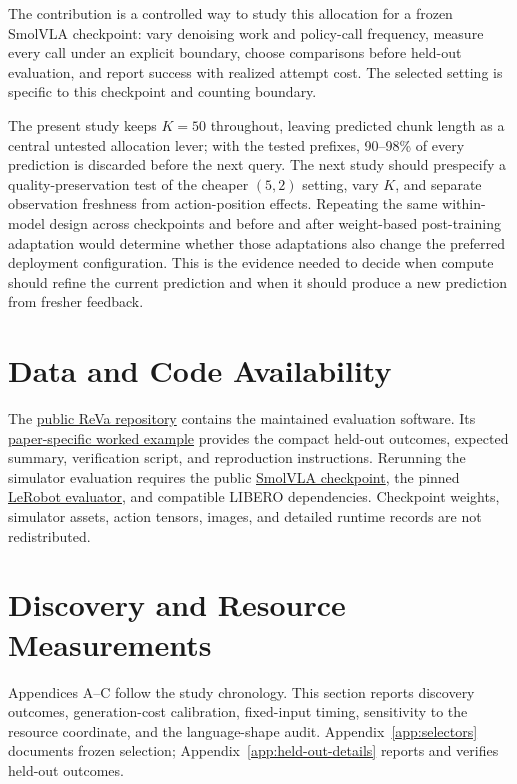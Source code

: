\documentclass{article}
\begin{document}
The contribution is a controlled way to study this allocation for a frozen
SmolVLA checkpoint: vary denoising work and policy-call frequency, measure every
call under an explicit boundary, choose comparisons before held-out evaluation,
and report success with realized attempt cost. The selected setting is specific
to this checkpoint and counting boundary.

The present study keeps $K=50$ throughout, leaving predicted chunk length as a
central untested allocation lever; with the tested prefixes, 90--98\% of every
prediction is discarded before the next query. The next study should
prespecify a quality-preservation test of the cheaper $(5,2)$ setting, vary $K$,
and separate observation freshness from action-position effects. Repeating the
same within-model design across checkpoints and before and after weight-based
post-training adaptation would determine whether those adaptations also change
the preferred deployment configuration. This is the evidence needed to decide
when compute should refine the current prediction and when it should produce a
new prediction from fresher feedback.

\section*{Data and Code Availability}
The \href{https://github.com/maatinstitute/ReVa}{public ReVa repository}
contains the maintained evaluation software. Its
\href{https://github.com/maatinstitute/ReVa/tree/main/examples/refinement_refresh}{paper-specific worked example}
provides the compact held-out outcomes, expected summary, verification script,
and reproduction instructions. Rerunning the simulator evaluation requires the
public \href{https://huggingface.co/HuggingFaceVLA/smolvla_libero}{SmolVLA checkpoint},
the pinned
\href{https://github.com/huggingface/lerobot/tree/b6ec0060779550c0a157ae34feb89e0cf86012a8}{LeRobot evaluator},
and compatible LIBERO dependencies. Checkpoint weights, simulator assets,
action tensors, images, and detailed runtime records are not redistributed.


{\raggedright}
\clearpage
\appendix

\section{Discovery and Resource Measurements}
\label{app:calibration}

Appendices A--C follow the study chronology. This section reports discovery
outcomes, generation-cost calibration, fixed-input timing, sensitivity to the
resource coordinate, and the language-shape audit. Appendix~\ref{app:selectors}
documents frozen selection; Appendix~\ref{app:held-out-details} reports and
verifies held-out outcomes.
\end{document}
